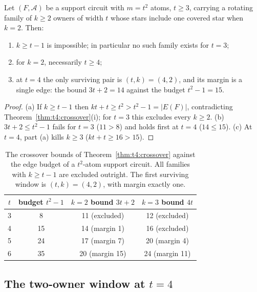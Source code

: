 \begin{corollary}\label{cor:t4:table}
Let \((F,\mathcal A)\) be a support circuit with \(m=t^2\) atoms,
\(t\ge3\), carrying a rotating family of \(k\ge2\) owners of width
\(t\) whose stars include one covered star when \(k=2\). Then:
\begin{enumerate}[label=\textup{(\alph*)}]
\item \(k\ge t-1\) is impossible; in particular no such family exists
for \(t=3\);
\item for \(k=2\), necessarily \(t\ge4\);
\item at \(t=4\) the only surviving pair is \((t,k)=(4,2)\), and its
margin is a single edge: the bound \(3t+2=14\) against the budget
\(t^2-1=15\).
\end{enumerate}
\end{corollary}

\begin{proof}
(a) If \(k\ge t-1\) then \(kt+t\ge t^2>t^2-1=|E(F)|\), contradicting
Theorem~\ref{thm:t4:crossover}(i); for \(t=3\) this excludes every
\(k\ge2\). (b) \(3t+2\le t^2-1\) fails for \(t=3\) (\(11>8\)) and holds
first at \(t=4\) (\(14\le15\)). (c) At \(t=4\), part (a) kills
\(k\ge3\) (\(kt+t\ge16>15\)).
\end{proof}

\begin{table}[ht]
\centering
\begin{tabular}{c@{\quad}c@{\quad}c@{\quad}c}
\toprule
\(t\) & budget \(t^2-1\) & \(k=2\) bound \(3t+2\) & \(k=3\) bound \(4t\)\\
\midrule
3 & 8  & 11 (excluded) & 12 (excluded)\\
4 & 15 & 14 (margin 1) & 16 (excluded)\\
5 & 24 & 17 (margin 7) & 20 (margin 4)\\
6 & 35 & 20 (margin 15) & 24 (margin 11)\\
\bottomrule
\end{tabular}
\caption{The crossover bounds of Theorem~\ref{thm:t4:crossover} against
the edge budget of a \(t^2\)-atom support circuit. All families with
\(k\ge t-1\) are excluded outright. The first surviving window is
\((t,k)=(4,2)\), with margin exactly one.}
\label{tab:t4:crossover}
\end{table}

\subsection{The two-owner window at \texorpdfstring{\(t=4\)}{t=4}}
\label{subsec:t4:window}

